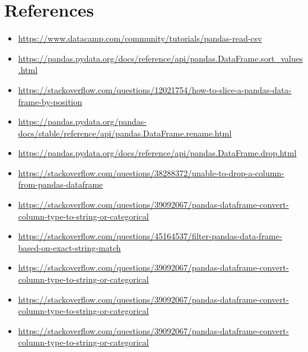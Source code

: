 \documentclass[12pt]{article}
\begin{document}
\section*{References}
\begin{itemize}
    \item {\url{https://www.datacamp.com/community/tutorials/pandas-read-csv}}
     \item {\url{https://pandas.pydata.org/docs/reference/api/pandas.DataFrame.sort_values.html}}
     \item {\url{https://stackoverflow.com/questions/12021754/how-to-slice-a-pandas-data-frame-by-position}}
     \item {\url{https://pandas.pydata.org/pandas-docs/stable/reference/api/pandas.DataFrame.rename.html}}
     \item {\url{https://pandas.pydata.org/docs/reference/api/pandas.DataFrame.drop.html}}
     \item {\url{https://stackoverflow.com/questions/38288372/unable-to-drop-a-column-from-pandas-dataframe}}
     \item {\url{https://stackoverflow.com/questions/39092067/pandas-dataframe-convert-column-type-to-string-or-categorical}}
     \item {\url{https://stackoverflow.com/questions/45164537/filter-pandas-data-frame-based-on-exact-string-match}}
     
     
     \item {\url{https://stackoverflow.com/questions/39092067/pandas-dataframe-convert-column-type-to-string-or-categorical}}
     \item {\url{https://stackoverflow.com/questions/39092067/pandas-dataframe-convert-column-type-to-string-or-categorical}}
     \item {\url{https://stackoverflow.com/questions/39092067/pandas-dataframe-convert-column-type-to-string-or-categorical}}
\end{itemize}
\end{document}
